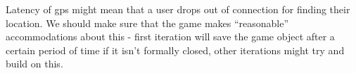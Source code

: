 Latency of gps might mean that a user drops out of connection for
finding their location. We should make sure that the game makes
``reasonable'' accommodations about this - first iteration will save
the game object after a certain period of time if it isn't formally
closed, other iterations might try and build on this.

